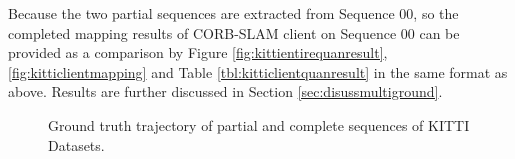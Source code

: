 Because the two partial sequences are extracted from Sequence 00, so the completed mapping results of CORB-SLAM client on Sequence 00 can be provided as a comparison by Figure \ref{fig:kittientirequanresult}, \ref{fig:kitticlientmapping} and Table \ref{tbl:kitticlientquanresult} in the same format as above. Results are further discussed in Section \ref{sec:disussmultiground}.

\begin{figure}
	\centering
	\vfill
	\caption{Ground truth trajectory of partial and complete sequences of KITTI Datasets.}
	\label{fig:kittigt}
\end{figure}

